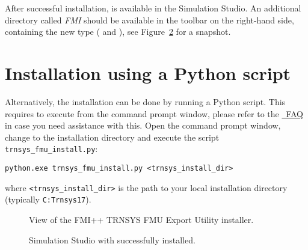 After successful installation, \type is available in the \trnsys Simulation Studio. An additional directory called \emph{FMI} should be available in the toolbar on the right-hand side, containing the new \trnsys type (\emph{\typea} and \emph{\typeb}), see Figure~\ref{fig:simulation_studio_overview} for a snapshot.


\section{Installation using a Python script}
\label{sec:install_script}

Alternatively, the installation can be done by running a Python script.
This requires to execute \python from the command prompt window, please refer to the \href{https://docs.python.org/2/faq/windows.html}{\python~FAQ} in case you need assistance with this.
Open the command prompt window, change to the installation directory and execute the script \texttt{trnsys\_fmu\_install.py}:
\begin{verbatim}
python.exe trnsys_fmu_install.py <trnsys_install_dir>
\end{verbatim}
where \texttt{<trnsys\_install\_dir>} is the path to your local \trnsys installation directory (typically \texttt{C:Trnsys17}).

\begin{figure}[h]
\caption{View of the FMI++ TRNSYS FMU Export Utility installer.}
\label{fig:trnsys_fmu_install_gui}
\end{figure}

\begin{figure}[h]
\caption{Simulation Studio with \type successfully installed.}
\label{fig:simulation_studio_overview}
\end{figure}

